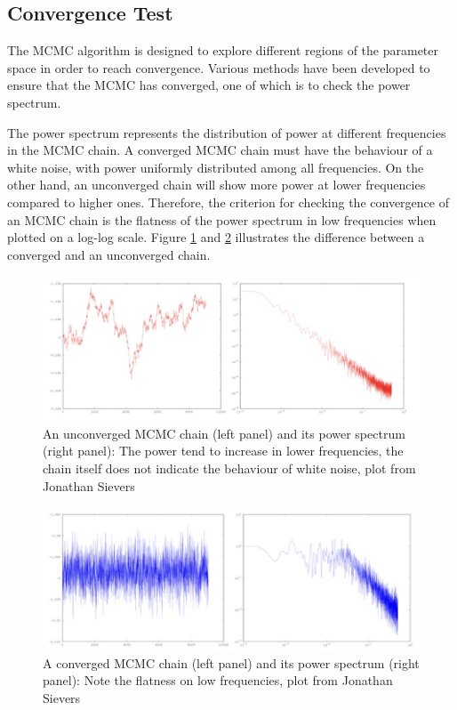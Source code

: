 \documentclass[12pt, TexShade, letterpaper]{report}
\begin{document}
\subsection{Convergence Test}
The MCMC algorithm is designed to explore different regions of the parameter space in order to reach convergence. Various methods have been developed to ensure that the MCMC has converged, one of which is to check the power spectrum.\par
The power spectrum represents the distribution of power at different frequencies in the MCMC chain. A converged MCMC chain must have the behaviour of a white noise, with power uniformly distributed among all frequencies. On the other hand, an unconverged chain will show more power at lower frequencies compared to higher ones. Therefore, the criterion for checking the convergence of an MCMC chain is the flatness of the power spectrum in low frequencies when plotted on a log-log scale. Figure \ref{fig:MCMC_unconverged} and \ref{fig:MCMC_converged} illustrates the difference between a converged and an unconverged chain.\par
\begin{figure}[h!]
\centering
\includegraphics[scale =0.9]{mcmc_uncoverged.jpg}
\caption[An unconverged MCMC chain and its power spectrum]{An unconverged MCMC chain (left panel) and its power spectrum (right panel): The power tend to increase in lower frequencies, the chain itself does not indicate the behaviour of white noise, plot from Jonathan Sievers}
\label{fig:MCMC_unconverged}
\end{figure}

\begin{figure}[h!]
\centering
\includegraphics[scale =0.9]{mcmc_converged.jpg}
\caption[A converged MCMC chain and its power spectrum]{A converged MCMC chain (left panel) and its power spectrum (right panel): Note the flatness on low frequencies, plot from Jonathan Sievers}
\label{fig:MCMC_converged}
\end{figure}
\end{document}
